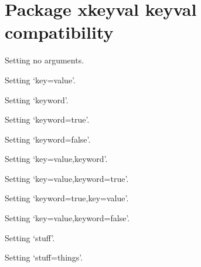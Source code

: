 \documentclass{article}
\begin{document}
  \section{Package xkeyval keyval compatibility}
  
  Setting no arguments. 
  
  Setting `key=value'. 
  
  Setting `keyword'. 

  Setting `keyword=true'. 

  Setting `keyword=false'. 
  
  Setting `key=value,keyword'. 
  
  Setting `key=value,keyword=true'. 

  Setting `keyword=true,key=value'. 

  Setting `key=value,keyword=false'. 
  
  Setting `stuff'. 
  
  Setting `stuff=things'. 
\end{document}
